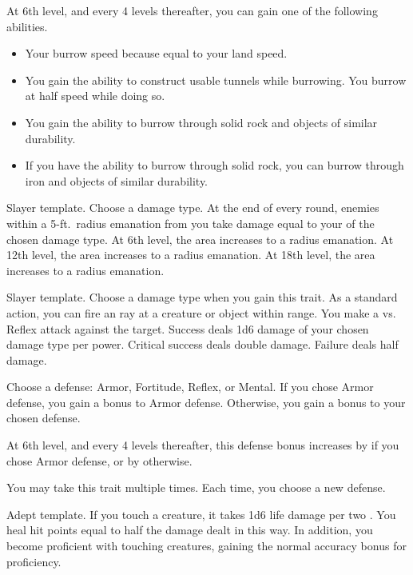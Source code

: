     At 6th level, and every 4 levels thereafter, you can gain one of the following abilities.
    \begin{itemize}
        \item Your burrow speed because equal to your land speed.
        \item You gain the ability to construct usable tunnels while burrowing.
            You burrow at half speed while doing so.
        \item You gain the ability to burrow through solid rock and objects of similar durability.
        \item If you have the ability to burrow through solid rock, you can burrow through iron and objects of similar durability.
    \end{itemize}

    \featpre Slayer template.
     Choose a damage type.
    \featben At the end of every round, enemies within a 5-ft.\ radius emanation from you take damage equal to your  of the chosen damage type.
    At 6th level, the area increases to a \areasmall radius emanation.
    At 12th level, the area increases to a \areamed radius emanation.
    At 18th level, the area increases to a \arealarge radius emanation.

    \featpre Slayer template.
     Choose a damage type when you gain this trait.
    \featben As a standard action, you can fire an ray at a creature or object within \rngclose range.
    You make a  vs. Reflex attack against the target.
    Success deals 1d6 damage of your chosen damage type per power.
    Critical success deals double damage.
    Failure deals half damage.

     Choose a defense: Armor, Fortitude, Reflex, or Mental.
    \featben If you chose Armor defense, you gain a  bonus to Armor defense.
    Otherwise, you gain a  bonus to your chosen defense.

    At 6th level, and every 4 levels thereafter, this defense bonus increases by  if you chose Armor defense, or by  otherwise.

     You may take this trait multiple times.
    Each time, you choose a new defense.

    \featpre Adept template.
    \featben If you touch a creature, it takes 1d6 life damage  per two .
    You heal hit points equal to half the damage dealt in this way.
    In addition, you become proficient with touching creatures, gaining the normal  accuracy bonus for proficiency.

